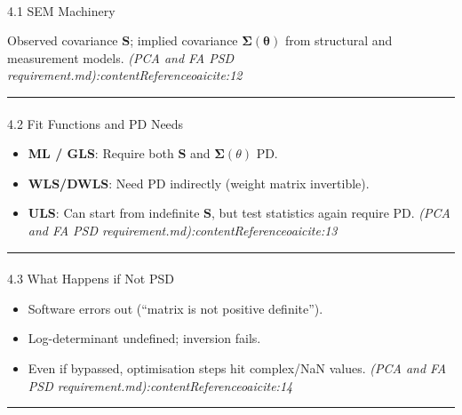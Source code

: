 \documentclass[
  letterpaper,
  DIV=11,
  numbers=noendperiod]{scrartcl}
\makeatletter
\let\oldparagraph\paragraph
\renewcommand{\paragraph}{
    \@ifstar
      \xxxParagraphStar
      \xxxParagraphNoStar
  }
\newcommand{\xxxParagraphStar}[1]{\oldparagraph*{#1}\mbox{}}
\newcommand{\xxxParagraphNoStar}[1]{\oldparagraph{#1}\mbox{}}
\providecommand{\tightlist}{%
  \setlength{\itemsep}{0pt}\setlength{\parskip}{0pt}}
\theoremstyle{remark}
\makeatother
\begin{document}
\paragraph{4.1 SEM Machinery}\label{sem-machinery}

Observed covariance \(\mathbf{S}\); implied covariance
\(\boldsymbol\Sigma(\boldsymbol\theta)\) from structural and measurement
models. \emph{(PCA and FA PSD
requirement.md):contentReference{oaicite:12}}

\begin{center}\rule{0.5\linewidth}{0.5pt}\end{center}

\paragraph{4.2 Fit Functions and PD
Needs}\label{fit-functions-and-pd-needs}

\begin{itemize}
\tightlist
\item
  \textbf{ML / GLS}: Require both \(\mathbf{S}\) and
  \(\boldsymbol\Sigma(\theta)\) PD.
\item
  \textbf{WLS/DWLS}: Need PD indirectly (weight matrix invertible).
\item
  \textbf{ULS}: Can start from indefinite \(\mathbf{S}\), but test
  statistics again require PD. \emph{(PCA and FA PSD
  requirement.md):contentReference{oaicite:13}}
\end{itemize}

\begin{center}\rule{0.5\linewidth}{0.5pt}\end{center}

\paragraph{4.3 What Happens if Not PSD}\label{what-happens-if-not-psd}

\begin{itemize}
\tightlist
\item
  Software errors out (``matrix is not positive definite'').
\item
  Log-determinant undefined; inversion fails.
\item
  Even if bypassed, optimisation steps hit complex/NaN values.
  \emph{(PCA and FA PSD requirement.md):contentReference{oaicite:14}}
\end{itemize}

\begin{center}\rule{0.5\linewidth}{0.5pt}\end{center}
\end{document}
